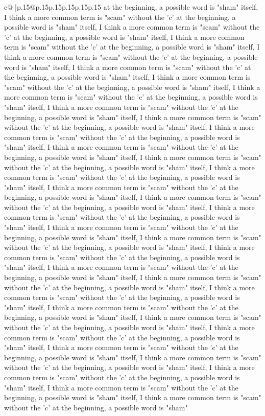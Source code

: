 \documentclass{article}
\begin{document}
{\begin{supertabular}{c@{$\;$}|p{.15\linewidth}@{}p{.15\linewidth}p{.15\linewidth}p{.15\linewidth}p{.15\linewidth}p{.15\linewidth}}
{{{at the beginning, a possible word is "sham" itself, I think a more common term is "scam" without the 'c' at the beginning, a possible word is "sham" itself, I think a more common term is "scam" without the 'c' at the beginning, a possible word is "sham" itself, I think a more common term is "scam" without the 'c' at the beginning, a possible word is "sham" itself, I think a more common term is "scam" without the 'c' at the beginning, a possible word is "sham" itself, I think a more common term is "scam" without the 'c' at the beginning, a possible word is "sham" itself, I think a more common term is "scam" without the 'c' at the beginning, a possible word is "sham" itself, I think a more common term is "scam" without the 'c' at the beginning, a possible word is "sham" itself, I think a more common term is "scam" without the 'c' at the beginning, a possible word is "sham" itself, I think a more common term is "scam" without the 'c' at the beginning, a possible word is "sham" itself, I think a more common term is "scam" without the 'c' at the beginning, a possible word is "sham" itself, I think a more common term is "scam" without the 'c' at the beginning, a possible word is "sham" itself, I think a more common term is "scam" without the 'c' at the beginning, a possible word is "sham" itself, I think a more common term is "scam" without the 'c' at the beginning, a possible word is "sham" itself, I think a more common term is "scam" without the 'c' at the beginning, a possible word is "sham" itself, I think a more common term is "scam" without the 'c' at the beginning, a possible word is "sham" itself, I think a more common term is "scam" without the 'c' at the beginning, a possible word is "sham" itself, I think a more common term is "scam" without the 'c' at the beginning, a possible word is "sham" itself, I think a more common term is "scam" without the 'c' at the beginning, a possible word is "sham" itself, I think a more common term is "scam" without the 'c' at the beginning, a possible word is "sham" itself, I think a more common term is "scam" without the 'c' at the beginning, a possible word is "sham" itself, I think a more common term is "scam" without the 'c' at the beginning, a possible word is "sham" itself, I think a more common term is "scam" without the 'c' at the beginning, a possible word is "sham" itself, I think a more common term is "scam" without the 'c' at the beginning, a possible word is "sham" itself, I think a more common term is "scam" without the 'c' at the beginning, a possible word is "sham" itself, I think a more common term is "scam" without the 'c' at the beginning, a possible word is "sham" itself, I think a more common term is "scam" without the 'c' at the beginning, a possible word is "sham" itself, I think a more common term is "scam" without the 'c' at the beginning, a possible word is "sham" itself, I think a more common term is "scam" without the 'c' at the beginning, a possible word is "sham" itself, I think a more common term is "scam" without the 'c' at the beginning, a possible word is "sham" itself, I think a more common term is "scam" without the 'c' at the beginning, a possible word is "sham" }}}
\end{supertabular}}
\end{document}
